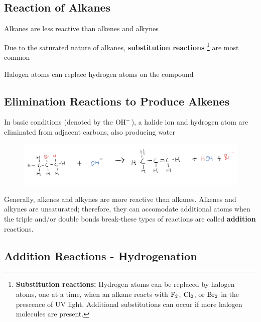 \subsection{Reaction of Alkanes}
\begin{bulleted-list}
    \item Alkanes are less reactive than alkenes and alkynes
    \item Due to the saturated nature of alkanes, \textbf{substitution reactions}
        \footnote{
            \textbf{Substitution reactions:} Hydrogen atoms can be replaced by halogen atoms, one
            at a time, when an alkane reacts with $\ch{F2}$, $\ch{Cl2}$, or $\ch{Br2}$ in the
            prescence of UV light. Additional substitutions can occur if more halogen molecules
            are present.
        }
        are most common
    \item Halogen atoms can replace hydrogen atoms on the compound
\end{bulleted-list}

\subsection{Elimination Reactions to Produce Alkenes}
In basic conditions (denoted by the $\ch{OH^-}$), a halide ion and hydrogen atom are eliminated from
adjacent carbons, also producing water
\begin{figure}[ht!]
    \centering
    \includegraphics[width=0.8 \textwidth]{../figures/elimination-alkene.png}
\end{figure}

\begin{important}
    Generally, alkenes and alkynes are more reactive than alkanes. Alkenes and alkynes are
    unsaturated; therefore, they can accomodate additional atoms when the triple and/or double
    bonds break-these types of reactions are called \textbf{addition} reactions.
\end{important}

\subsection{Addition Reactions - Hydrogenation}

